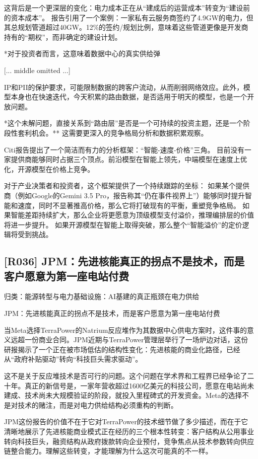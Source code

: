 \documentclass[11pt]{ctexart}
\begin{document}
这背后是一个更深层的变化：电力成本正在从“建成后的运营成本”转变为“建设前的资本成本”。 报告引用了一个案例：一家私有云服务商签约了4.9GW的电力，但其总规划管道超过40GW。12\%的签约/规划比例，意味着这些管道更像是开发商持有的“期权”，而非确定的建设计划。

*对于投资者而言，这意味着数据中心的真实供给弹

[... middle omitted ...]

IP和PII的保护要求，可能限制数据的跨客户流动，从而削弱网络效应。此外，模型本身也在快速迭代，今天积累的路由数据，是否适用于明天的模型，也是一个开放问题。

*这个未解问题，直接关系到“路由层”是否是一个可持续的投资主题，还是一个阶段性套利机会。** 这需要更深入的竞争格局分析和数据积累观察。

Citi报告提出了一个简洁而有力的分析框架：“智能-速度-价格”三角。 目前没有一家提供商能够同时占据三个顶点。前沿模型在智能上领先，中端模型在速度上优化，开源模型在价格上竞争。

对于产业决策者和投资者，这个框架提供了一个持续跟踪的坐标： 如果某个提供商（例如Google的Gemini 3.5 Pro，报告称其“仍在事件视界上”）能够同时提升智能和速度，同时不显著推高价格，那么它将打破现有的平衡，重塑竞争格局。 如果智能差距持续扩大，那么企业将更愿意为顶级模型支付溢价，推理编排层的价值将进一步提升。 如果开源模型在智能上取得突破，那么整个“智能溢价”的定价逻辑将受到挑战。

\subsection{[R036] JPM：先进核能真正的拐点不是技术，而是客户愿意为第一座电站付费}
{\small\color{refgray}归类：能源转型与电力基础设施：AI基建的真正瓶颈在电力供给}

JPM：先进核能真正的拐点不是技术，而是客户愿意为第一座电站付费

当Meta选择TerraPower的Natrium反应堆作为其数据中心供电方案时，这件事的意义远超一份商业合同。JPM近期与TerraPower管理层举行了一场炉边对话，这份研报揭示了一个正在被市场低估的结构性变化：先进核能的商业化路径，已经从“政府补贴驱动”转向“科技巨头需求驱动”。

这不是关于反应堆技术是否可行的问题。这个问题在学术界和工程界已经争论了二十年。真正的新信号是，一家年营收超过1600亿美元的科技公司，愿意在电站尚未建成、技术尚未大规模验证的阶段，就投入里程碑式的开发资金。Meta的选择不是对技术的赌注，而是对电力供给结构必须重构的判断。

JPM这份报告的价值不在于它对TerraPower的技术细节做了多少描述，而在于它清晰地展示了先进核能商业模式正在经历的三个根本性转变：客户结构从公用事业转向科技巨头，融资结构从政府拨款转向企业预付，竞争焦点从技术参数转向供应链整合能力。理解这些转变，才能理解为什么这次可能真的不一样。
\end{document}
